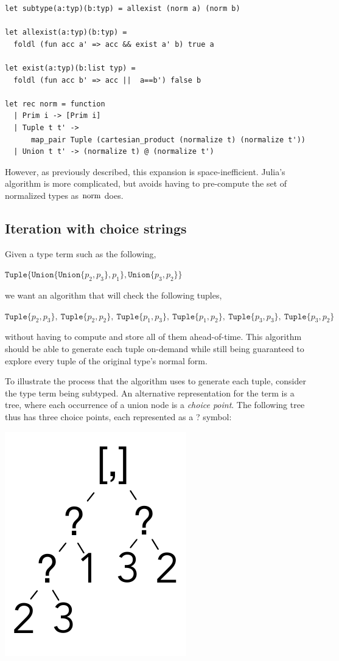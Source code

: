 \documentclass[a4paper,english]{lipics-v2019}
\newcommand{\xt}[1]{\texttt{#1}}
\newcommand{\union}[2]{\xt{Union\{}#1,#2\xt{\}}}
\renewcommand{\c}[1]{\ensuremath{\text{\lstinline{#1}}}\xspace}
\newcommand{\tuple}[1]{\xt{Tuple\{}#1\xt{\}}}
\begin{document}
\begin{lstlisting}
let subtype(a:typ)(b:typ) = allexist (norm a) (norm b)

let allexist(a:typ)(b:typ) = 
  foldl (fun acc a' => acc && exist a' b) true a

let exist(a:typ)(b:list typ) = 
  foldl (fun acc b' => acc ||  a==b') false b

let rec norm = function
  | Prim i -> [Prim i]
  | Tuple t t' -> 
      map_pair Tuple (cartesian_product (normalize t) (normalize t'))
  | Union t t' -> (normalize t) @ (normalize t')
\end{lstlisting}

However, as previously described, this expansion is space-inefficient. Julia's
algorithm is more complicated, but avoids having to pre-compute the set of normalized
types as \c{norm} does. 


\subsection{Iteration with choice strings}\label{cs}

Given a type term such as the following,

\medskip
$\tuple{ \union{ \union{p_2}{p_3} }{p_1}, \union{p_3}{p_2}}$
\medskip

\noindent
we want an algorithm that will check the following tuples,

\medskip
\noindent $\tuple{p_2,p_3}, ~ \tuple{p_2,p_2}, ~ \tuple{p_1,p_3}, ~ \tuple{p_1,p_2}, ~
  \tuple{p_3,p_3}, ~ \tuple{p_3,p_2}$
\medskip

without having to compute and store all of them ahead-of-time. This algorithm
should be able to generate each tuple on-demand while still being guaranteed to 
explore every tuple of the original type's normal form.

To illustrate the process that the algorithm uses to generate each tuple,
consider the type term being subtyped. An alternative representation for the
term is a tree, where each occurrence of a union node is a \emph{choice point}.
The following tree thus has three choice points, each represented as a ?
symbol: 
\medskip

\includegraphics[scale=.25]{figures/tree1.pdf}
\smallskip
\end{document}
